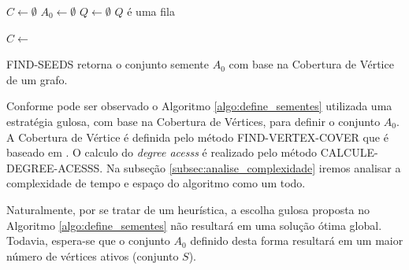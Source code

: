 \documentclass[12pt]{article}
\begin{document}
\begin{algorithm}[!t]
\DontPrintSemicolon %
	
	$C \gets \emptyset$\;
	$A_{0} \gets \emptyset$\;
	$Q \gets \emptyset$ {$Q$ é uma fila}\;
	
	$C \gets $ \;
\;
\caption{{\sc FIND-SEEDS} retorna o conjunto semente $A_0$ com base na Cobertura de Vértice de um grafo.}
\label{algo:define_sementes}
\end{algorithm}

Conforme pode ser observado o Algoritmo \ref{algo:define_sementes} utilizada uma estratégia gulosa, com base na Cobertura de Vértices, para definir o conjunto $A_{0}$. A Cobertura de Vértice é definida pelo método \textsc{FIND-VERTEX-COVER} que é baseado em \cite{Cormen:2009:IAT:1614191}{}. O calculo do \textit{degree acesss} é realizado pelo método \textsc{CALCULE-DEGREE-ACESSS}{}. Na subseção \ref{subsec:analise_complexidade} iremos analisar a complexidade de tempo e espaço do algoritmo como um todo.

Naturalmente, por se tratar de um heurística, a escolha gulosa proposta no Algoritmo \ref{algo:define_sementes} não resultará em uma solução ótima global. Todavia, espera-se que o conjunto $A_0$ definido desta forma resultará em um maior número de vértices ativos (conjunto $S$).
\end{document}
